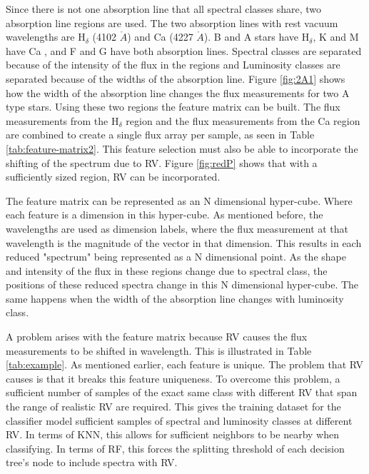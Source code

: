 \documentclass[trackchanges, floatfix, twocolumn, tighten]{aastex62}
\newcommand{\RomanNumeralCaps}[1] {\MakeUppercase{\romannumeral #1}}
\begin{document}
Since there is not one absorption line that all spectral classes share, two absorption line regions are used. The two absorption lines with rest vacuum wavelengths are H$_\delta$ (4102 $\mathring{A}$) and Ca \RomanNumeralCaps{1} (4227 $\mathring{A}$). B and A stars have H$_\delta$, K and M have Ca \RomanNumeralCaps{1}, and F and G have both absorption lines. Spectral classes are separated because of the intensity of the flux in the regions and Luminosity classes are separated because of the widths of the absorption line. Figure \ref{fig:2A1} shows how the width of the absorption line changes the flux measurements for two A type stars. Using these two regions the feature matrix can be built. The flux measurements from the H$_\delta$ region and the flux measurements from the Ca \RomanNumeralCaps{1} region are combined to create a single flux array per sample, as seen in Table \ref{tab:feature-matrix2}. This feature selection must also be able to incorporate the shifting of the spectrum due to RV. Figure \ref{fig:redP} shows that with a sufficiently sized region, RV can be incorporated.

The feature matrix can be represented as an N dimensional hyper-cube.  Where each feature is a dimension in this hyper-cube. As mentioned before, the wavelengths are used as dimension labels, where the flux measurement at that wavelength is the magnitude of the vector in that dimension. This results in each reduced "spectrum" being represented as a N dimensional point. As the shape and intensity of the flux in these regions change due to spectral class, the positions of these reduced spectra change in this N dimensional hyper-cube. The same happens when the width of the absorption line changes with luminosity class.

A problem arises with the feature matrix because RV causes the flux measurements to be shifted in wavelength. This is illustrated in Table \ref{tab:example}. As mentioned earlier, each feature is unique. The problem that RV causes is that it breaks this feature uniqueness. To overcome this problem, a sufficient number of samples of the exact same class with different RV that span the range of realistic RV are required. This gives the training dataset for the classifier model sufficient samples of spectral and luminosity classes at different RV. In terms of KNN, this allows for sufficient neighbors to be nearby when classifying. In terms of RF, this forces the splitting threshold of each decision tree's node to include spectra with RV. 

\end{document}
